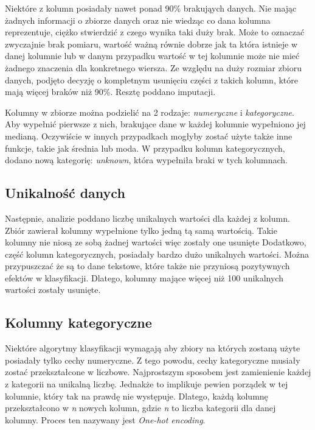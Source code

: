 \documentclass[a4paper,12pt]{article}
\begin{document}
    Niektóre z kolumn posiadały nawet ponad 90\% brakująych danych.
    Nie mając żadnych informacji o zbiorze danych oraz nie wiedząc co dana kolumna reprezentuje, ciężko stwierdzić z czego wynika taki duży brak.
    Może to oznaczać zwyczajnie brak pomiaru, wartość ważną równie dobrze jak ta która istnieje w danej kolumnie lub w danym przypadku wartość w tej kolumnie może nie mieć żadnego znaczenia dla konkretnego wiersza.
    Ze względu na duży rozmiar zbioru danych, podjęto decyzję o kompletnym usunięciu części z takich kolumn, które mają więcej braków niż 90\%.
    Resztę poddano imputacji.

    Kolumny w zbiorze można podzielić na 2 rodzaje: \textit{numeryczne} i \textit{kategoryczne}.
    Aby wypełnić pierwsze z nich, brakujące dane w każdej kolumnie wypełniono jej medianą.
    Oczywiście w innych przypadkach mogłyby zostać użyte także inne funkcje, takie jak średnia lub moda.
    W przypadku kolumn kategorycznych, dodano nową kategorię: \textit{unknown}, która wypełniła braki w tych kolumnach.

    \subsection{Unikalność danych}
    Następnie, analizie poddano liczbę unikalnych wartości dla każdej z kolumn.
    Zbiór zawierał kolumny wypełnione tylko jedną tą samą wartością.
    Takie kolumny nie niosą ze sobą żadnej wartości więc zostały one usunięte
    Dodatkowo, część kolumn kategorycznych, posiadały bardzo dużo unikalnych wartości.
    Można przypuszczać że są to dane tekstowe, które także nie przyniosą pozytywnych efektów w klasyfikacji.
    Dlatego, kolumny mające więcej niż 100 unikalnych wartości zostały usunięte.

    \subsection{Kolumny kategoryczne}
    Niektóre algorytmy klasyfikacji wymagają aby zbiory na których zostaną użyte posiadały tylko cechy numeryczne.
    Z tego powodu, cechy kategoryczne musiały zostać przekształcone w liczbowe.
    Najprostszym sposobem jest zamienienie każdej z kategorii na unikalną liczbę.
    Jednakże to implikuje pewien porządek w tej kolumnie, który tak na prawdę nie występuje.
    Dlatego, każdą kolumnę przekształcono w \textit{n} nowych kolumn, gdzie \textit{n} to liczba kategorii dla danej kolumny.
    Proces ten nazywany jest \textit{One-hot encoding}.
\end{document}

